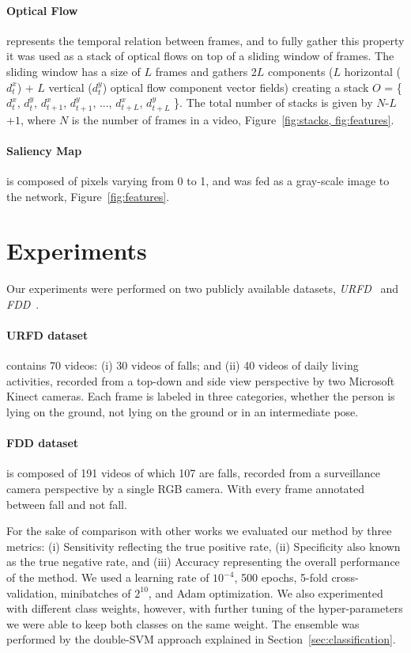 \documentclass[conference]{IEEEtran}
\begin{document}
\paragraph{Optical Flow} represents the temporal relation between frames, and to fully gather this property it was used as a stack of optical flows on top of a sliding window of frames. The sliding window has a size of $L$ frames and gathers 2$L$ components ($L$ horizontal ($d_t^x$) + $L$ vertical ($d_t^y$) optical flow component vector fields) creating a stack $O$ = \{$d_t^x$, $d_t^y$, $d_{t+1}^x$, $d_{t+1}^y$, ..., $d_{t+L}^x$, $d_{t+L}^y$ \}. The total number of stacks is given by $N$-$L$+$1$, where $N$ is the number of frames in a video, Figure~\ref{fig:stacks, fig:features}. 
\paragraph{Saliency Map} is composed of pixels varying from 0 to 1, and was fed as a gray-scale image to the network, Figure~\ref{fig:features}.

\section{Experiments}
\label{sec:experiments}

Our experiments were performed on two publicly available datasets, \textit{URFD}~\cite{kepski2014human} and \textit{FDD}~\cite{charfi2013optimised}.

\paragraph{URFD dataset} contains 70 videos: (i) 30 videos of falls; and (ii) 40 videos of daily living activities, recorded from a top-down and side view perspective by two Microsoft Kinect cameras. Each frame is labeled in three categories, whether the person is lying on the ground, not lying on the ground or in an intermediate pose.
\paragraph{FDD dataset} is composed of 191 videos of which 107 are falls, recorded from a surveillance camera perspective by a single RGB camera. With every frame annotated between fall and not fall.

For the sake of comparison with other works we evaluated our method by three metrics: (i) Sensitivity reflecting the true positive rate, (ii) Specificity also known as the true negative rate, and (iii) Accuracy representing the overall performance of the method. We used a learning rate of $10^{-4}$, 500 epochs, 5-fold cross-validation, minibatches of $2^{10}$, and Adam optimization. We also experimented with different class weights, however, with further tuning of the hyper-parameters we were able to keep both classes on the same weight. The ensemble was performed by the double-SVM approach explained in Section~\ref{sec:classification}.
\end{document}
